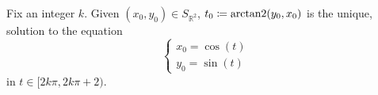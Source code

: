 \begin{proposition}\label{thm:arctantwo}
  Fix an integer \( k \). Given \( (x_0, y_0) \in S_{\BbbR^2} \), \( t_0 \coloneqq \operatorname{arctan2}(y_0, x_0) \) is the unique, solution to the equation
  \begin{equation}\label{thm:arctantwo/equation}
    \begin{cases}
      x_0 = \cos(t) \\
      y_0 = \sin(t)
    \end{cases}
  \end{equation}
  in \( t \in [2k\pi, 2k\pi + 2) \).
\end{proposition}
